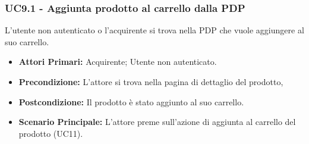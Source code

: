 \subsubsection{UC9.1 - Aggiunta prodotto al carrello dalla PDP}
\label{UC9.1}
L'utente non autenticato o l'acquirente si trova nella PDP che vuole aggiungere al suo carrello.
\begin{itemize}
    \item \textbf{Attori Primari:} Acquirente; Utente non autenticato.
    \item \textbf{Precondizione:} L'attore si trova nella pagina di dettaglio del prodotto,
    \item \textbf{Postcondizione:} Il prodotto è stato aggiunto al suo carrello.
    \item \textbf{Scenario Principale:} L'attore preme sull'azione di aggiunta al carrello del prodotto (UC11).
\end{itemize}
